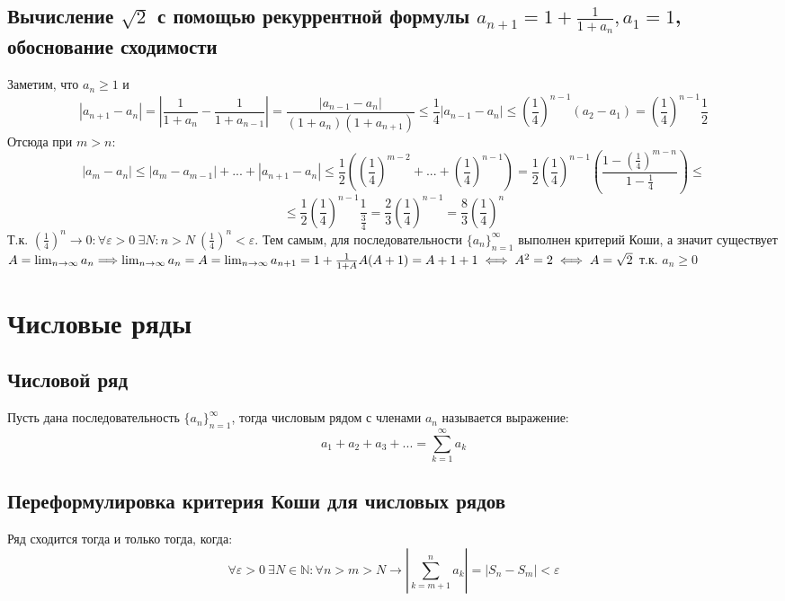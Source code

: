 \documentclass[12pt]{article}
\theoremstyle{definition}
\begin{document}
\subsection{Вычисление $\sqrt{2}$ с помощью рекуррентной формулы $a_{n+1} = 1 + \frac{1}{1+a_n}, a_1 = 1$, обоснование сходимости} Заметим, что $a_n \geqslant 1$ и $$|a_{n+1} - a_n| = \left|\frac{1}{1+a_n} - \frac{1}{1+a_{n-1}} \right| = \frac{|a_{n-1} - a_n|}{(1+a_n)(1+a_{n+1})} \leqslant \frac{1}{4}|a_{n-1} - a_n| \leqslant \left(\frac{1}{4}\right)^{n-1}(a_2 - a_1) = \left(\frac{1}{4}\right)^{n-1} \frac{1}{2}$$ Отсюда при $m > n:$ $$|a_m - a_n| \leqslant |a_m - a_{m-1}| +...+ |a_{n+1} - a_n| \leqslant \frac{1}{2}\left(\left(\frac{1}{4}\right)^{m-2} + ... + \left(\frac{1}{4}\right)^{n-1}\right) = \frac{1}{2}\left(\frac{1}{4}\right)^{n-1}\left(\frac{1 - \left(\frac{1}{4}\right)^{m-n}}{1 - \frac{1}{4}}\right) \leqslant$$\newline$$\leqslant \frac{1}{2}\left(\frac{1}{4}\right)^{n-1}\frac{1}{\frac{3}{4}} = \frac{2}{3}\left(\frac{1}{4}\right)^{n-1} = \frac{8}{3}\left(\frac{1}{4}\right)^n$$ Т.к. $\left(\frac{1}{4}\right)^n \rightarrow 0: \forall \varepsilon > 0 \ \exists N: n> N \ \left(\frac{1}{4}\right)^n < \varepsilon$. Тем самым, для последовательности $\{a_n\}_{n=1}^\infty$ выполнен критерий Коши, а значит существует $A = \lim_{n\to\infty} a_n \Longrightarrow \lim_{n\to\infty} a_n = A = \lim_{n\to\infty} a_{n+1} = 1 + \frac{1}{1 + A} \\ A(A+1) = A + 1 + 1 \iff A^2 = 2 \iff A = \sqrt{2}$ т.к. $a_n \geqslant 0$

\section{Числовые ряды}

\subsection{Числовой ряд}
Пусть дана последовательность $\textstyle\{a_n\}_{n=1}^{\infty}$, тогда числовым рядом с членами $a_n$ называется выражение:
$$a_1 + a_2 + a_3 + ... = \displaystyle\sum_{k = 1}^{\infty}a_k$$

\subsection{Переформулировка критерия Коши для числовых рядов}
Ряд сходится тогда и только тогда, когда:
$$\forall \varepsilon > 0 \ \exists N \in \mathbb{N} : \forall n > m > N \to \left|\displaystyle\sum_{k = m + 1}^n a_k\right| = |S_n - S_m| < \varepsilon$$
\end{document}
